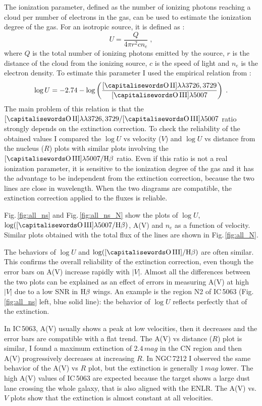 \documentclass[../main.tex]{subfiles}
\begin{document}
The ionization parameter, defined as the number of ionizing photons reaching a cloud per number of electrons in the gas, can be used to estimate the ionization degree of the gas.
For an isotropic source, it is defined as :
\begin{equation}
U=\frac{Q}{4\pi r^2 c n_e}\;,
\end{equation}
where $Q$ is the total number of ionizing photons emitted by the source, $r$ is the distance of the cloud from the ionizing source, $c$ is the speed of light and $n_e$ is the electron density.
To estimate this parameter I used the empirical relation from \citet{Penston90}:
\begin{equation}
\label{eq:U}
\log U= -2.74 - \log\left(\frac{[\rm\ion{O}{II}]\lambda\lambda3726,3729}{[\rm\ion{O}{III}]\lambda5007}\right)\;.
\end{equation}
The main problem of this relation is that the $[\rm\ion{O}{II}]\lambda\lambda3726,3729/ [\rm\ion{O}{III}]\lambda5007$ ratio strongly depends on the extinction correction.
To check the reliability of the obtained values I compared the $\log U$ vs velocity ($V$) and $\log U$ vs distance from the nucleus ($R$) plots with similar plots involving the $[\rm\ion{O}{III}]\lambda5007/\Hb$ ratio.
Even if this ratio is not a real ionization parameter, it is sensitive to the ionization degree of the gas and it has the advantage to be independent from the extinction correction, because the two lines are close in wavelength.
When the two diagrams are compatible, the extinction correction applied to the fluxes is reliable.

Fig.\,\ref{fig:all_ns} and Fig.\,\ref{fig:all_ns_N} show the plots of  $\log U$, $\log([\rm\ion{O}{III}]\lambda5007/\Hb)$, A(V) and $n_e$ as a function of velocity.
Similar plots obtained with the total flux of the lines are shown in Fig.\,\ref{fig:all_N}.

The behaviors of $\log U$ and $\log([\rm\ion{O}{III}]/\Hb)$ are often similar.
This confirms the overall reliability of the extinction correction, even though the error bars on A(V) increase rapidly with $\lvert V \rvert$.
Almost all the differences between the two plots can be explained as an effect of errors in measuring A(V) at high $\lvert V \rvert$ due to a low SNR in $\rm H\beta$ wings.
An example is the region N2 of IC\,5063 (Fig.\,\ref{fig:all_ns} left, blue solid line):  the behavior of $\log U$ reflects perfectly that of the extinction.

In IC\,5063, A(V) usually shows a peak at low velocities, then it decreases and the error bars are compatible with a flat trend.
The A(V) vs distance ($R$) plot is similar, I found a maximum extinction of $2.4\,\si{mag}$ in the CN region and then A(V) progressively decreases at increasing $R$.
In NGC\,7212 I observed the same behavior of the A(V) vs $R$ plot, but the extinction is generally $1\,\si{mag}$ lower.
The high A(V) values of IC\,5063 are expected because the target shows a large dust lane crossing the whole galaxy, that is also aligned with the ENLR.
The A(V) vs. $V$ plots show that the extinction is almost constant at all velocities.
\end{document}
